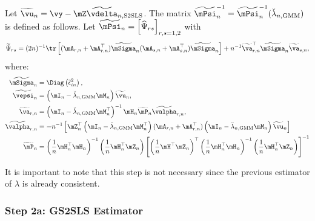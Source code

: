 \documentclass[english,12pt]{book}\usepackage[]{graphicx}\usepackage[]{xcolor}
\begin{document}
Let $\widetilde{\vu}_n = \vy - \mZ\widetilde{\vdelta}_{n, \textrm{S2SLS}}$. The matrix $\widetilde{\mPsi}^{-1}_n= \widetilde{\mPsi}^{-1}_n (\breve{\lambda}_{n,\textrm{GMM}})$ is defined as follows. Let $\widetilde{\mPsi}_n = \left[\widehat{\Psi}_{rs}\right]_{r,s = 1, 2}$ with
\begin{equation}\label{eq:Psi-first-step}
\widetilde{\Psi}_{rs} = (2n)^{-1}\tr\left[(\mA_{r, n} + \mA_{r, n}^\top)\widetilde{\mSigma}_n(\mA_{s, n} + \mA_{s, n}^\top)\widetilde{\mSigma}_n\right] + n^{-1}\widetilde{\va}_{r, n}^\top\widetilde{\mSigma}_n\widetilde{\va}_{s, n},
\end{equation}
%
where:
\begin{equation*}
  \begin{aligned}
    \widetilde{\mSigma}_n  & = \Diag\left(\widetilde{\epsilon}_{in}^2\right), \\
    \widetilde{\vepsi}_n   & = \left(\mI_n - \breve{\lambda}_{n, \textrm{GMM}}\mM_n\right)\widetilde{\vu}_n, \\
    \widetilde{\va}_{r,n} & = \left(\mI_n - \breve{\lambda}_{n, \textrm{GMM}}\mM_n^\top\right)^{-1}\mH_n\widetilde{\mP}_n\widetilde{\valpha}_{r,n},  \\
    \widetilde{\valpha}_{r,n} & = - n^{-1}\left[\mZ^\top_n\left(\mI_n - \breve{\lambda}_{n, \textrm{GMM}}\mM_n^\top\right)(\mA_{r, n} + \mA_{r, n}^\top)\left(\mI_n - \breve{\lambda}_{n, \textrm{GMM}}\mM_n\right)\widetilde{\vu}_n\right] \\
    \widetilde{\mP}_n & = \left(\frac{1}{n}\mH^\top_n\mH_n\right)^{-1}\left(\frac{1}{n}\mH_n^\top\mZ_n \right)\left[\left(\frac{1}{n}\mH^\top\mZ_n\right)^\top\left(\frac{1}{n}\mH^\top_n\mH_n\right)^{-1}\left(\frac{1}{n}\mH^\top_n\mZ_n\right)\right]^{-1}
  \end{aligned}
\end{equation*}

It is important to note that this step is not necessary since the previous estimator of $\lambda$ is already consistent. 

\subsubsection{Step 2a: GS2SLS Estimator}
\end{document}
